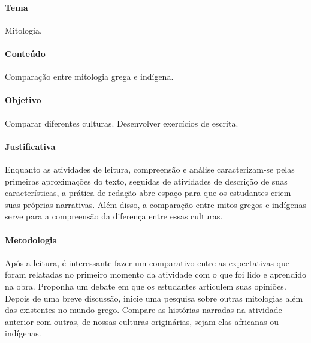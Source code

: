 \documentclass[11pt]{extarticle}
\begin{document}

\paragraph{Tema} Mitologia. 

\paragraph{Conteúdo} Comparação entre mitologia grega e indígena.

\paragraph{Objetivo} Comparar diferentes culturas. Desenvolver exercícios de escrita.

\paragraph{Justificativa} Enquanto as atividades de leitura, compreensão e análise caracterizam-se pelas primeiras aproximações do texto, seguidas de atividades de descrição de suas características, a prática de redação abre espaço para que os estudantes criem suas próprias narrativas. Além disso, a comparação entre mitos gregos e indígenas serve para a compreensão da diferença entre essas culturas. 

\paragraph{Metodologia} Após a leitura, é interessante fazer um comparativo entre as expectativas que foram relatadas no primeiro momento da atividade com o que foi lido e aprendido na obra. Proponha um debate em que os estudantes articulem suas opiniões. Depois de uma breve discussão, inicie uma pesquisa sobre outras mitologias além das existentes no mundo grego. Compare as histórias narradas na atividade anterior com outras, de nossas culturas originárias, sejam elas africanas ou indígenas.  
\end{document}
